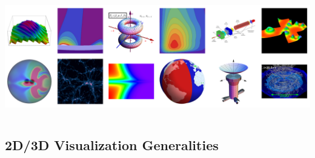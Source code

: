 \begin{frame}
\begin{columns}
\begin{column}{7.5cm}
        \href{http://journals.aps.org/prd/kaleidoscope/August2014}{\includegraphics[width=\columnwidth]{figs/plots/mpc/kaleidoscope_aug2014}}
    \end{column}
    \end{columns}
\end{frame}


\subsection{2D/3D Visualization Generalities}
